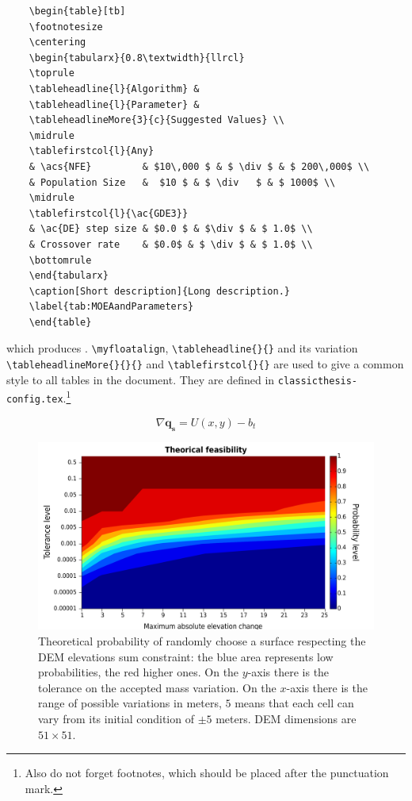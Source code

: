 \begin{itemize}
\begin{verbatim}
	\begin{table}[tb]
	\footnotesize
	\centering
	\begin{tabularx}{0.8\textwidth}{llrcl}
	\toprule
	\tableheadline{l}{Algorithm} &
	\tableheadline{l}{Parameter} &
	\tableheadlineMore{3}{c}{Suggested Values} \\
	\midrule
	\tablefirstcol{l}{Any}
	& \acs{NFE} 		& $10\,000 $ & $ \div $ & $ 200\,000$ \\
	& Population Size 	&  $10 $ & $ \div 	$ & $ 1000$ \\
	\midrule
	\tablefirstcol{l}{\ac{GDE3}}
	& \ac{DE} step size & $0.0 $ & $\div $ & $ 1.0$ \\
	& Crossover rate 	& $0.0$ & $ \div $ & $ 1.0$ \\
	\bottomrule
	\end{tabularx}
	\caption[Short description]{Long description.}
	\label{tab:MOEAandParameters}
	\end{table}
	\end{verbatim}
    which produces .
    \verb!\myfloatalign!, \verb!\tableheadline{}{}! and its
    variation \verb!\tableheadlineMore{}{}{}! and
    \verb!\tablefirstcol{}{}! are used to give a common style to
    all tables in the document. They are defined in
    \verb!classicthesis-config.tex!.\footnote{Also do not forget
    footnotes, which should be placed after the punctuation mark.}
\end{itemize}

\begin{equation}
\nabla \mathbf{q_s} = U(x,y) - b_t
\label{eq:massConservation}
\end{equation}

\begin{figure}
\centering
\includegraphics[width=\columnwidth]{Images/feasibilityNR51.pdf}  
\caption[Theoretical probability of randomly choose a surface
respecting the \ac{DEM} elevations sum constraint]{Theoretical
probability of randomly choose a surface respecting the \ac{DEM}
elevations sum constraint: the blue area represents low
probabilities, the red higher ones. On the $y$-axis there is the
tolerance on the accepted mass variation. On the $x$-axis there is
the range of possible variations in meters, \eg $5$ means that
each cell can vary from its initial condition of $\pm 5$ meters.
\acs{DEM} dimensions are $51 \times 51$.}
\label{fig:massConstraintFeasibility}
\end{figure}

